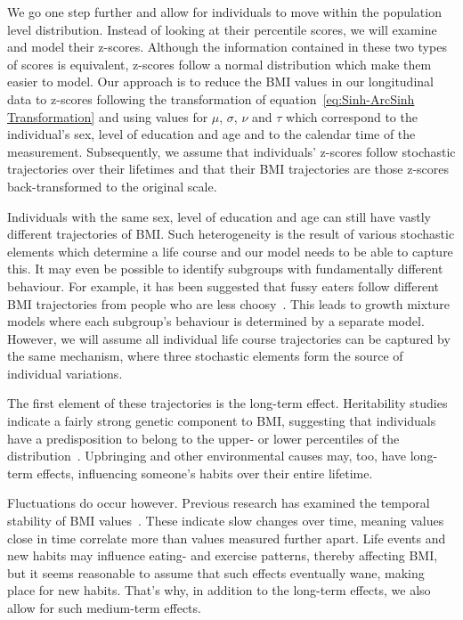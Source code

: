 \documentclass{imammb}
\numberwithin{equation}{section}
\begin{document}
We go one step further and allow for individuals to move within the population level distribution. Instead of looking at their percentile scores, we will examine and model their z-scores. Although the information contained in these two types of scores is equivalent, z-scores follow a normal distribution which make them easier to model. Our approach is to reduce the BMI values in our longitudinal data to z-scores following the transformation of equation~\ref{eq:Sinh-ArcSinh Transformation} and using values for $\mu$, $\sigma$, $\nu$ and $\tau$ which correspond to the individual's sex, level of education and age and to the calendar time of the measurement. Subsequently, we assume that individuals' z-scores follow stochastic trajectories over their lifetimes and that their BMI trajectories are those z-scores back-transformed to the original scale.

Individuals with the same sex, level of education and age can still have vastly different trajectories of BMI. Such heterogeneity is the result of various stochastic elements which determine a life course and our model needs to be able to capture this. It may even be possible to identify subgroups with fundamentally different behaviour. For example, it has been suggested that fussy eaters follow different BMI trajectories from people who are less choosy~\citep{Herle2020}. This leads to growth mixture models where each subgroup's behaviour is determined by a separate model. However, we will assume all individual life course trajectories can be captured by the same mechanism, where three stochastic elements form the source of individual variations.

The first element of these trajectories is the long-term effect. Heritability studies indicate a fairly strong genetic component to BMI, suggesting that individuals have a predisposition to belong to the upper- or lower percentiles of the distribution~\citep{Mathias2003, Goode2007, Ordonana2007}. Upbringing and other environmental causes may, too, have long-term effects, influencing someone's habits over their entire lifetime.

Fluctuations do occur however. Previous research has examined the temporal stability of BMI values~\citep{Wilsgaard2001, Ulmer2003, Juhola2011, Bayer2011}. These indicate slow changes over time, meaning values close in time correlate more than values measured further apart. Life events and new habits may influence eating- and exercise patterns, thereby affecting BMI, but it seems reasonable to assume that such effects eventually wane, making place for new habits. That's why, in addition to the long-term effects, we also allow for such medium-term effects.
\end{document}

